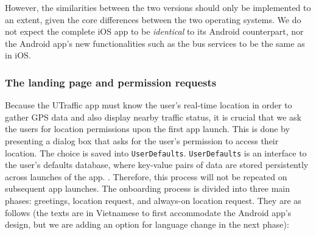 However, the similarities between the two versions should only be implemented to an extent, given the core differences between the two operating systems. We do not expect the complete iOS app to be \textit{identical} to its Android counterpart, nor the Android app's new functionalities such as the bus services to be the same as in iOS. 

\subsubsection{The landing page and permission requests}
Because the UTraffic app must know the user's real-time location in order to gather GPS data and also display nearby traffic status, it is crucial that we ask the users for location permissions upon the first app launch. This is done by presenting a dialog box that asks for the user's permission to access their location. The choice is saved into \lstinline{UserDefaults}. \lstinline{UserDefaults} is an interface to the user's defaults database, where key-value pairs of data are stored persistently across launches of the app. \cite{a2019_userdefaults}. Therefore, this process will not be repeated on subsequent app launches. The onboarding process is divided into three main phases: greetings, location request, and always-on location request. They are as follows (the texts are in Vietnamese to first accommodate the Android app's design, but we are adding an option for language change in the next phase):

